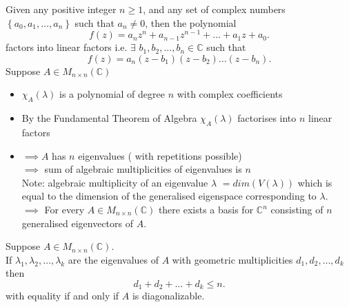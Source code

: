 \documentclass{report}
\begin{document}
    {
      Given any positive integer $ n \ge 1$, and any set of complex numbers $ \left\{ a_0, a_1, \ldots , a_n \right\}$ such that $ a_n \neq 0$, then the polynomial 
      \[
      f \left( z \right) = a_n z^n + a_{n-1} z^{n-1} + \ldots + a_1 z + a_0
      .\] 
      factors into linear factors i.e. $ \exists $ $ b_1 , b_2 ,\ldots , b_n \in \mathbb{C}$ such that
      \[
      f \left( z \right) = a_n \left( z - b_1 \right) \left( z - b_2 \right) \ldots \left( z - b_n \right)
      .\] 
    }
    Suppose $ A \in M_{ n \times  n} \left(  \mathbb{C} \right) $
    \begin{itemize}
     \item $ \chi _A \left( \lambda \right) $ is a polynomial of degree $ n$ with complex coefficients
     \item By the Fundamental Theorem of Algebra $ \chi _A \left( \lambda \right) $ factorises into $ n$ linear factors
     \item $ \implies A$ has $ n$ eigenvalues ( with repetitions possible) \\
      $ \implies$ sum of algebraic multiplicities of eigenvalues is $ n$ \\
      Note: algebraic multiplicity of an eigenvalue $ \lambda$ $ = dim \left( V \left( \lambda \right)  \right) $ which is equal to the dimension of the generalised eigenspace corresponding to $ \lambda$.\\
      $ \implies$ For every $ A \in M _{ n \times  n} \left(  \mathbb{C} \right) $  there exists a basis for $ \mathbb{C} ^{n}$ consisting of $ n$ generalised eigenvectors of $ A$.
    \end{itemize}
    \begin{corollary}[ ]
              Suppose $ A \in M_{ n \times n} \left(  \mathbb{C} \right) $.\\
              If $ \lambda_1 , \lambda_2, \ldots , \lambda_k$ are the eigenvalues of $ A$ with geometric multiplicities $ d_1, d_2, \ldots , d_k$ then 
              \[
              d_1+d_2+\ldots + d_k \leq n
              .\] 
              with equality if and only if $ A$ is diagonalizable.
    \end{corollary}
    
    
     
\end{document}
